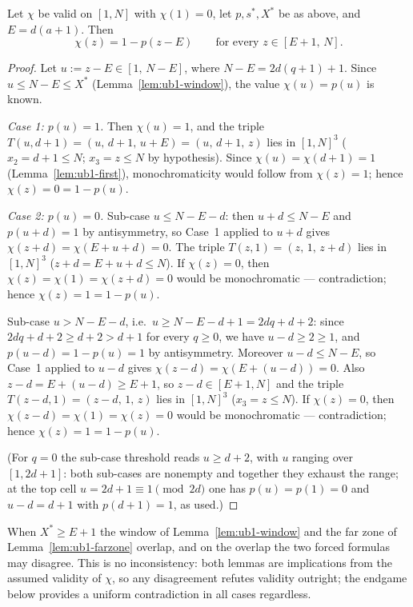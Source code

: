 \begin{lemma}\label{lem:ub1-farzone}
Let $\chi$ be valid on $[1,N]$ with $\chi(1) = 0$, let $p, s^{*}, X^{*}$ be
as above, and $E = d(a+1)$. Then
\[
\chi(z) = 1 - p(z - E) \qquad \text{for every } z \in [E+1,\, N] .
\]
\end{lemma}

\begin{proof}
Let $u := z - E \in [1,\, N - E]$, where $N - E = 2d(q+1) + 1$. Since
$u \le N - E \le X^{*}$ (Lemma~\ref{lem:ub1-window}), the value
$\chi(u) = p(u)$ is known.

\emph{Case 1: $p(u) = 1$.} Then $\chi(u) = 1$, and the triple
$T(u, d+1) = (u,\, d+1,\, u + E) = (u,\, d+1,\, z)$ lies in $[1,N]^3$
($x_2 = d + 1 \le N$; $x_3 = z \le N$ by hypothesis). Since
$\chi(u) = \chi(d+1) = 1$ (Lemma~\ref{lem:ub1-first}), monochromaticity
would follow from $\chi(z) = 1$; hence $\chi(z) = 0 = 1 - p(u)$.

\emph{Case 2: $p(u) = 0$.} Sub-case $u \le N - E - d$: then
$u + d \le N - E$ and $p(u + d) = 1$ by antisymmetry, so Case~1 applied to
$u + d$ gives $\chi(z + d) = \chi(E + u + d) = 0$. The triple
$T(z, 1) = (z,\, 1,\, z + d)$ lies in $[1,N]^3$
($z + d = E + u + d \le N$). If $\chi(z) = 0$, then
$\chi(z) = \chi(1) = \chi(z + d) = 0$ would be monochromatic ---
contradiction; hence $\chi(z) = 1 = 1 - p(u)$.

Sub-case $u > N - E - d$, i.e.\ $u \ge N - E - d + 1 = 2dq + d + 2$: since
$2dq + d + 2 \ge d + 2 > d + 1$ for every $q \ge 0$, we have
$u - d \ge 2 \ge 1$, and $p(u - d) = 1 - p(u) = 1$ by antisymmetry.
Moreover $u - d \le N - E$, so Case~1 applied to $u - d$ gives
$\chi(z - d) = \chi(E + (u - d)) = 0$. Also
$z - d = E + (u - d) \ge E + 1$, so $z - d \in [E+1, N]$ and the triple
$T(z - d, 1) = (z - d,\, 1,\, z)$ lies in $[1,N]^3$ ($x_3 = z \le N$). If
$\chi(z) = 0$, then $\chi(z - d) = \chi(1) = \chi(z) = 0$ would be
monochromatic --- contradiction; hence $\chi(z) = 1 = 1 - p(u)$.

(For $q = 0$ the sub-case threshold reads $u \ge d + 2$, with $u$ ranging
over $[1, 2d+1]$: both sub-cases are nonempty and together they exhaust
the range; at the top cell $u = 2d + 1 \equiv 1 \pmod{2d}$ one has
$p(u) = p(1) = 0$ and $u - d = d + 1$ with $p(d+1) = 1$, as used.)
\end{proof}

\begin{remark}
When $X^{*} \ge E + 1$ the window of Lemma~\ref{lem:ub1-window} and the far
zone of Lemma~\ref{lem:ub1-farzone} overlap, and on the overlap the two
forced formulas may disagree. This is no inconsistency: both lemmas are
implications from the assumed validity of $\chi$, so any disagreement
refutes validity outright; the endgame below provides a uniform
contradiction in all cases regardless.
\end{remark}

